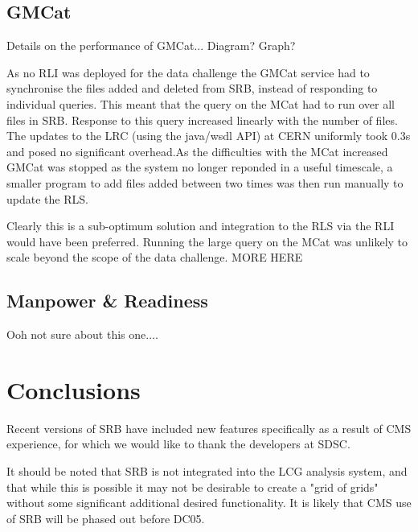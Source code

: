 \documentclass{cmspaper}
\begin{document}
\subsection{GMCat}
Details on the performance of GMCat...
Diagram? Graph?

As no RLI was deployed for the data challenge the GMCat service had to synchronise the files 
added and deleted from SRB, instead of responding to individual queries. This meant that the 
query on the MCat had to run over all files in SRB. Response to this query increased linearly 
with the number of files. The updates to the LRC (using the java/wsdl API) at CERN uniformly 
took 0.3s and posed no significant overhead.As the difficulties with the MCat increased GMCat 
was stopped as the system no longer reponded in a useful timescale, a smaller program to add
files added between two times was then run manually to update the RLS.

Clearly this is a sub-optimum solution and integration to the RLS via the RLI would have been 
preferred. Running the large query on the MCat was unlikely to scale beyond the scope of the 
data challenge. MORE HERE

\subsection{Manpower \& Readiness}
Ooh not sure about this one....

\section{Conclusions}
Recent versions of SRB have included new features specifically as a 
result of CMS experience, for which we would like to thank the developers
at SDSC.

It should be noted that SRB is not integrated into the LCG analysis
system, and that while this is possible it may not be desirable to create a "grid of grids" 
without some significant additional desired functionality.  It is likely that CMS
use of SRB will be phased out before DC05.
\end{document}
